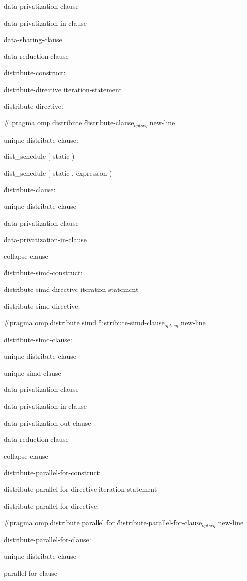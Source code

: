 {\I data-privatization-clause

\I data-privatization-in-clause

\I data-sharing-clause

\I data-reduction-clause

distribute-construct:

\I distribute-directive iteration-statement

distribute-directive:

\C\I \# pragma omp distribute \G distribute-clause$_{optseq}$ new-line

unique-distribute-clause:

\C\I dist\_schedule ( static )

\C\I dist\_schedule ( static , \G expression \C )

\G distribute-clause:

\I unique-distribute-clause

\I data-privatization-clause

\I data-privatization-in-clause

\I collapse-clause

\G distribute-simd-construct:

\I distribute-simd-directive iteration-statement

distribute-simd-directive:

\C\I \#pragma omp distribute simd \G distribute-simd-clause$_{optseq}$ new-line

distribute-simd-clause:

\I unique-distribute-clause

\I unique-simd-clause

\I data-privatization-clause

\I data-privatization-in-clause

\I data-privatization-out-clause

\I data-reduction-clause

\I collapse-clause

distribute-parallel-for-construct:

\I distribute-parallel-for-directive iteration-statement

distribute-parallel-for-directive:

\C\I \#pragma omp distribute parallel for \G distribute-parallel-for-clause$_{optseq}$ new-line

distribute-parallel-for-clause:

\I unique-distribute-clause

\I parallel-for-clause

}
